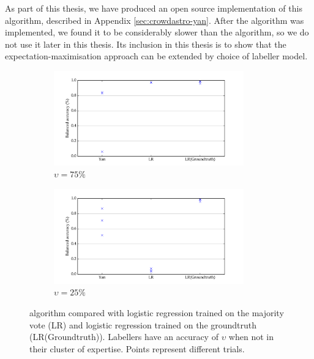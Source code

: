         As part of this thesis, we have produced an open source implementation
        of this algorithm, described in Appendix \ref{sec:crowdastro-yan}. After
        the algorithm was implemented, we found it to be considerably slower
        than the \citeauthor{raykar10} algorithm, so we do not use it later in
        this thesis. Its inclusion in this thesis is to show that the
        expectation-maximisation approach can be extended by choice of labeller
        model.

        \begin{figure}
            \centering
            \begin{subfigure}{\textwidth}
                \centering
                \includegraphics[width=0.9\textwidth]
                    {images/experiments/yan_25pc_noise.pdf}
                \caption{$\upsilon = 75\%$}
                \label{fig:yan-experiment-low-noise}
            \end{subfigure}
            \begin{subfigure}{\textwidth}
                \centering
                \includegraphics[width=0.9\textwidth]
                    {images/experiments/yan_75pc_noise.pdf}
                \caption{$\upsilon = 25\%$}
                \label{fig:yan-experiment-high-noise}
            \end{subfigure}
            \caption{\citeauthor{yan10} algorithm compared with logistic
                regression trained on the majority vote (LR) and logistic
                regression trained on the groundtruth (LR(Groundtruth)).
                Labellers have an accuracy of $\upsilon$ when not in
                their cluster of expertise. Points represent different trials.}
        \end{figure}

